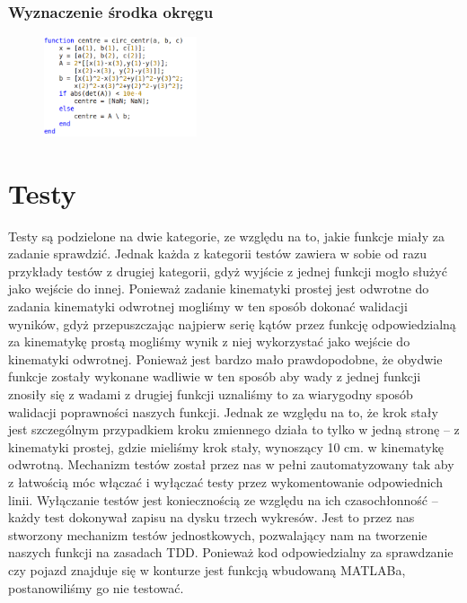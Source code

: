 \documentclass[a4paper, 12pt]{report}
\begin{document}
			\subsection{Wyznaczenie środka okręgu}
				\begin{figure}[H]
					\includegraphics[width = 0.4\textwidth]{./img/centr.png}
				\end{figure}
	\chapter{Testy}
		Testy są podzielone na dwie kategorie, ze względu na to, jakie funkcje miały za zadanie sprawdzić. Jednak każda z kategorii testów zawiera w sobie od razu przykłady testów z drugiej kategorii, gdyż wyjście z jednej funkcji mogło służyć jako wejście do innej. Ponieważ zadanie kinematyki prostej jest odwrotne do zadania kinematyki odwrotnej mogliśmy w ten sposób dokonać walidacji wyników, gdyż przepuszczając najpierw serię kątów przez funkcję odpowiedzialną za kinematykę prostą mogliśmy wynik z niej wykorzystać jako wejście do kinematyki odwrotnej.
		\newline 
		\newline
		Ponieważ jest bardzo mało prawdopodobne, że obydwie funkcje zostały wykonane wadliwie w ten sposób aby wady z jednej funkcji znosiły się z wadami z drugiej funkcji uznaliśmy to za wiarygodny sposób walidacji poprawności naszych funkcji. Jednak ze względu na to, że krok stały jest szczególnym przypadkiem kroku zmiennego działa to tylko w jedną stronę -- z kinematyki prostej, gdzie mieliśmy krok stały, wynoszący 10 cm. w kinematykę odwrotną.
		\newline 
		\newline
		Mechanizm testów został przez nas w pełni zautomatyzowany tak aby z łatwością móc włączać \linebreak i wyłączać testy przez wykomentowanie odpowiednich linii. Wyłączanie testów jest koniecznością ze względu na ich czasochłonność -- każdy test dokonywał zapisu na dysku trzech wykresów. Jest to przez nas stworzony mechanizm testów jednostkowych, pozwalający nam na tworzenie naszych funkcji na zasadach TDD. Ponieważ kod odpowiedzialny za sprawdzanie czy pojazd znajduje się w konturze jest funkcją wbudowaną MATLABa, postanowiliśmy go nie testować.
\end{document}
